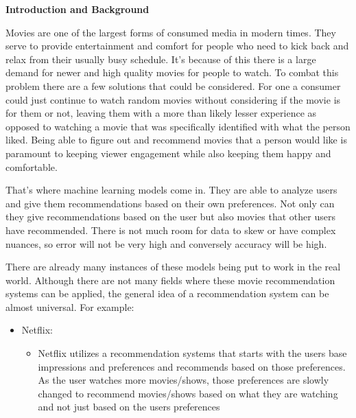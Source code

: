 \documentclass[11pt]{article}
\begin{document}


\large

    \begin{flushleft}
        \textbf{\LARGE Introduction and Background}
    \end{flushleft}

\vspace{0.3cm}
\justifying
Movies are one of the largest forms of consumed media in modern times. They serve to provide entertainment and comfort for people who need to kick back and relax from their usually busy schedule. It’s because of this there is a large demand for newer and high quality movies for people to watch. To combat this problem there are a few solutions that could be considered. For one a consumer could just continue to watch random movies without considering if the movie is for them or not, leaving them with a more than likely lesser experience as opposed to watching a movie that was specifically identified with what the person liked. Being able to figure out and recommend movies that a person would like is paramount to keeping viewer engagement while also keeping them happy and comfortable.

\vspace{0.3cm}

That’s where machine learning models come in. They are able to analyze users and give them recommendations based on their own preferences. Not only can they give recommendations based on the user but also movies that other users have recommended. There is not much room for data to skew or have complex nuances, so error will not be very high and conversely accuracy will be high.

\vspace{0.3cm}

There are already many instances of these models being put to work in the real world. Although there are not many fields where these movie recommendation systems can be applied, the general idea of a recommendation system can be almost universal. For example:

\vspace{0.3cm}

    \begin{itemize}
        \item Netflix:
        \begin{itemize}
            \item Netflix utilizes a recommendation systems that starts with the users base impressions and preferences and recommends based on those preferences. As the user watches more movies/shows, those preferences are slowly changed to recommend movies/shows based on what they are watching and not just based on the users preferences
        \end{itemize}
    \end{itemize}
	
\end{document}
